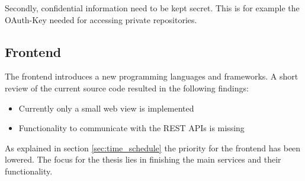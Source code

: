 Secondly, confidential information need to be kept secret.
This is for example the OAuth-Key needed for accessing private \gh{} repositories.


\subsection{Frontend}
\label{sec:review_frontend}
The frontend introduces a new programming languages and frameworks.
A short review of the current source code resulted in the following findings:
\begin{itemize}
	\item Currently only a small web view is implemented
	\item Functionality to communicate with the REST APIs is missing
\end{itemize}


As explained in section \ref{sec:time_schedule} the priority for the frontend has been lowered.
The focus for the thesis lies in finishing the main services and their functionality.

